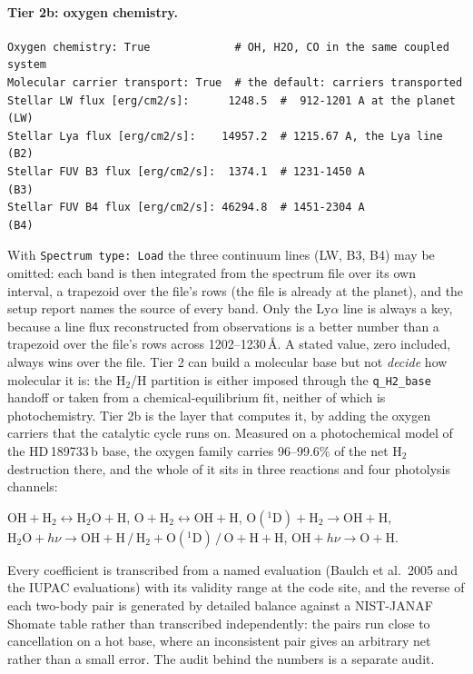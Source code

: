 \documentclass[english,a4paper]{my_memo}
\begin{document}
\paragraph{Tier 2b: oxygen chemistry.}\label{sec:oxychem}
\begin{verbatim}
Oxygen chemistry: True             # OH, H2O, CO in the same coupled system
Molecular carrier transport: True  # the default: carriers transported
Stellar LW flux [erg/cm2/s]:      1248.5  #  912-1201 A at the planet (LW)
Stellar Lya flux [erg/cm2/s]:    14957.2  # 1215.67 A, the Lya line   (B2)
Stellar FUV B3 flux [erg/cm2/s]:  1374.1  # 1231-1450 A               (B3)
Stellar FUV B4 flux [erg/cm2/s]: 46294.8  # 1451-2304 A               (B4)
\end{verbatim}
With \texttt{Spectrum type: Load} the three continuum lines (LW, B3, B4) may
be omitted: each band is then integrated from the spectrum file over its own
interval, a trapezoid over the file's rows (the file is already at the
planet), and the setup report names the source of every band. Only the
Ly$\alpha$ line is always a key, because a line flux reconstructed from
observations is a better number than a trapezoid over the file's rows across
1202--1230\,\AA. A stated value, zero included, always wins over the file.
Tier 2 can build a molecular base but not \emph{decide} how molecular it is:
the H$_2$/H partition is either imposed through the \texttt{q\_H2\_base}
handoff or taken from a chemical-equilibrium fit, neither of which is
photochemistry. Tier 2b is the layer that computes it, by adding the oxygen
carriers that the catalytic cycle runs on. Measured on a photochemical model of
the HD\,189733\,b base, the oxygen family carries 96--99.6\% of the net H$_2$
destruction there, and the whole of it sits in three reactions and four
photolysis channels:
\begin{center}\small
$\mathrm{OH+H_2\leftrightarrow H_2O+H}$, \quad
$\mathrm{O+H_2\leftrightarrow OH+H}$, \quad
$\mathrm{O(^1D)+H_2\to OH+H}$, \\
$\mathrm{H_2O}+h\nu\to\mathrm{OH+H}\,/\,\mathrm{H_2+O(^1D)}\,/\,\mathrm{O+H+H}$,
\quad $\mathrm{OH}+h\nu\to\mathrm{O+H}$.
\end{center}
Every coefficient is transcribed from a named evaluation (Baulch et al.\
2005 and the IUPAC evaluations) with its validity
range at the code site, and the reverse of each two-body pair is generated by
detailed balance against a NIST-JANAF Shomate table rather than transcribed
independently: the pairs run close to cancellation on a hot base, where an
inconsistent pair gives an arbitrary net rather than a small error. The audit
behind the numbers is a separate audit.
\end{document}
